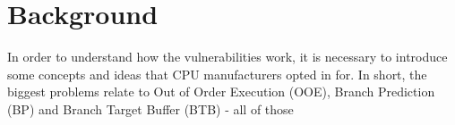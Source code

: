 \documentclass{article}
\begin{document}
\section{Background}

In order to understand how the vulnerabilities work, it is necessary to introduce some concepts and ideas that CPU manufacturers opted in for. In short, the biggest problems relate to Out of Order Execution (OOE), Branch Prediction (BP) and Branch Target Buffer (BTB) - all of those 
 
 
 
\end{document}
